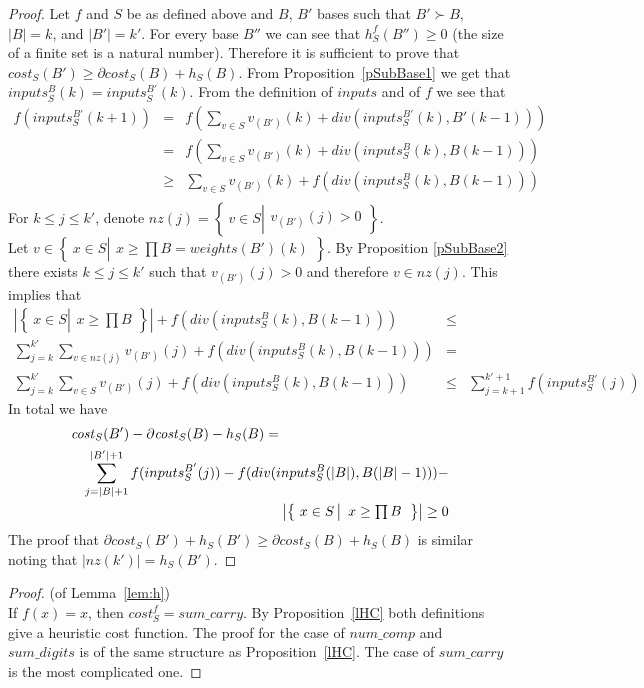 \documentclass[envcountsame]{llncs}
\newcommand{\sumCarry}{\mathit{sum\_carry}}
\newcommand{\sumDigits}{\mathit{sum\_digits}}
\newcommand{\numComparators}{\mathit{num\_comp}}
\newcommand{\cost}{\mathit{cost}}
\newcommand{\sset}[2]{\left\{~#1  \left|
      \begin{array}{l}#2\end{array}
    \right.     \right\}}
\begin{document}
\begin{proof} 
  Let $f$ and $S$ be as defined above and $B$, $B'$ bases such that
  $B'\succ B$, $|B|=k$, and $|B'|=k'$.  For every base $B''$ we can
  see that $h_S^f(B'')\geq 0$ (the size of a finite set is a natural
  number).  Therefore it is sufficient to prove that $\cost_S(B')
  \geq \partial \cost_S(B) + h_S(B)$.  From
  Proposition~\ref{pSubBase1} we get that
  $inputs_S^B(k)=inputs_S^{B'}(k)$.  From the definition of $inputs$
  and of $f$ we see that
  \begin{eqnarray*}
     f(inputs_S^{B'}(k+1)) &=& 
         f(\sum_{v\in S}v_{(B')}(k)+ div(inputs_S^{B'}(k),B'(k-1)))\\
     &=&  f(\sum_{v\in S}v_{(B')}(k)+ div(inputs_S^{B}(k),B(k-1)))\\ 
     &\geq& \sum_{v\in S}v_{(B')}(k)+ f(div(inputs_S^{B}(k),B(k-1))) \\
  \end{eqnarray*}
For $k \leq j \leq k'$, denote $nz(j)=\sset{v \in
    S}{v_{(B')}(j)>0}$.  \\
  Let $v \in \sset{x \in S}{ x \geq \prod B =
    weights(B')(k)}$. By Proposition \ref{pSubBase2} there exists $k
  \leq j \leq k'$ such that $v_{(B')}(j) > 0 $ and therefore $v \in
  nz(j)$.  This implies that
  \begin{eqnarray*}
    | \sset{x \in S}{ x \geq \prod B } |  +  
         f(div(inputs_S^{B}(k),B(k-1))) &\leq& \\
    \sum_{j=k}^{k'} \sum_{v \in nz(j)} v_{(B')}(j)  + 
          f( div(inputs_S^{B}(k),B(k-1)))  & =& \\
    \sum_{j=k}^{k'} \sum_{v \in S} v_{(B')}(j)  +  
        f(div(inputs_S^{B}(k),B(k-1)))  & \leq& 
    \sum_{j=k+1}^{k'+1}f( inputs_S^{B'}(j))
 \end{eqnarray*}
 In total we have  
\begin{eqnarray*}
   \lefteqn{\cost_S(B')  - \partial \cost_S(B) - h_S(B) =}\\
&&     \sum_{j=|B|+1}^{|B'|+1} f(inputs_S^{B'}(j)) - 
                 f(div(inputs_S^B(|B|),B(|B|-1)))-  \\
&&               
               \quad\left| \sset{x \in S}{ x \geq \prod B} \right| \geq 0
\end{eqnarray*}
The proof that $\partial \cost_S(B') + h_S(B') \geq \partial
\cost_S(B) + h_S(B)$ is similar noting that $|nz(k')|=h_S(B')$.
\end{proof}


\begin{proof}(of Lemma~\ref{lem:h})\\
  If $f(x)=x$, then $cost_S^f =
  \sumCarry$.  By Proposition~\ref{lHC} both
  definitions give a heuristic cost function. 
  The proof for the case of $\numComparators$ and $\sumDigits$ 
   is of the same structure as Proposition~\ref{lHC}. The case of $ \sumCarry$ is the most complicated one.
\end{proof}
\end{document}
